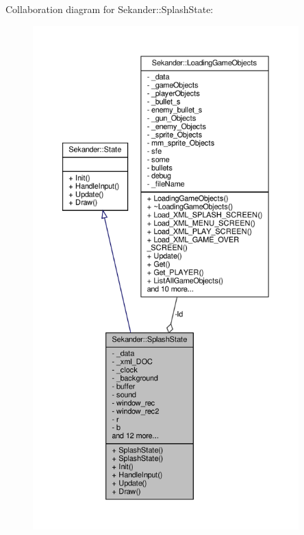 Collaboration diagram for Sekander\+:\+:Splash\+State\+:
\nopagebreak
\begin{figure}[H]
\begin{center}
\leavevmode
\includegraphics[height=550pt]{classSekander_1_1SplashState__coll__graph}
\end{center}
\end{figure}
